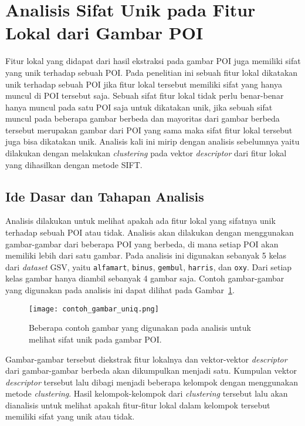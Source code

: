 \section{Analisis Sifat Unik pada Fitur Lokal dari Gambar POI}
\label{sec:analisis_keunikan}
Fitur lokal yang didapat dari hasil ekstraksi pada gambar POI juga memiliki sifat yang unik terhadap sebuah POI. Pada penelitian ini sebuah fitur lokal dikatakan unik terhadap sebuah POI jika fitur lokal tersebut memiliki sifat yang hanya muncul di POI tersebut saja. Sebuah sifat fitur lokal tidak perlu benar-benar hanya muncul pada satu POI saja untuk dikatakan unik, jika sebuah sifat muncul pada beberapa gambar berbeda dan mayoritas dari gambar berbeda tersebut merupakan gambar dari POI yang sama maka sifat fitur lokal tersebut juga bisa dikatakan unik. Analisis kali ini mirip dengan analisis sebelumnya yaitu dilakukan dengan melakukan \textit{clustering} pada vektor \textit{descriptor} dari fitur lokal yang dihasilkan dengan metode SIFT.

\subsection{Ide Dasar dan Tahapan Analisis}
Analisis dilakukan untuk melihat apakah ada fitur lokal yang sifatnya unik terhadap sebuah POI atau tidak. Analisis akan dilakukan dengan menggunakan gambar-gambar dari beberapa POI yang berbeda, di mana setiap POI akan memiliki lebih dari satu gambar. Pada analisis ini digunakan sebanyak 5 kelas dari \textit{dataset} GSV, yaitu \texttt{alfamart}, \texttt{binus}, \texttt{gembul}, \texttt{harris}, dan \texttt{oxy}. Dari setiap kelas gambar hanya diambil sebanyak 4 gambar saja. Contoh gambar-gambar yang digunakan pada analisis ini dapat dilihat pada Gambar~\ref{fig:analisis_uniqueness}. 
\begin{figure}[H]
	\centering
	\texttt{[image: contoh\_gambar\_uniq.png]}	
	\caption{Beberapa contoh gambar yang digunakan pada analisis untuk melihat sifat unik pada gambar POI.}
	\label{fig:analisis_uniqueness}
\end{figure}

Gambar-gambar tersebut diekstrak fitur lokalnya dan vektor-vektor \textit{descriptor} dari gambar-gambar berbeda akan dikumpulkan menjadi satu. Kumpulan vektor \textit{descriptor} tersebut lalu dibagi menjadi beberapa kelompok dengan menggunakan metode \textit{clustering}. Hasil kelompok-kelompok dari \textit{clustering} tersebut lalu akan dianalisis untuk melihat apakah fitur-fitur lokal dalam kelompok tersebut memiliki sifat yang unik atau tidak.

